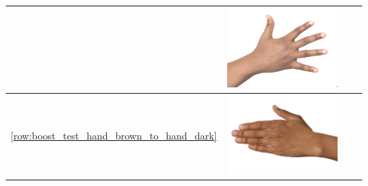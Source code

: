\documentclass[12pt, a4paper]{article}
\begin{document}
\begin{longtable}{|c||c|c|c|}
\begin{minipage}{.29\textwidth}
  \end{minipage} & 
  \begin{minipage}{.29\textwidth}
    \includegraphics[width=\textwidth,height=\textheight,keepaspectratio]{../rc_test/outputs/20170516_boost_test/hand_dark_to_hand_light.jpg}
  \end{minipage} \\
    \hline  \ref{row:boost_test_hand_brown_to_hand_dark} &
  \begin{minipage}{.29\textwidth}
    \includegraphics[width=\textwidth,height=\textheight,keepaspectratio]{../inputs/hand_brown.jpg}
  \end{minipage} & 
  \begin{minipage}{.29\textwidth}

\end{minipage}
\end{longtable}
\end{document}
